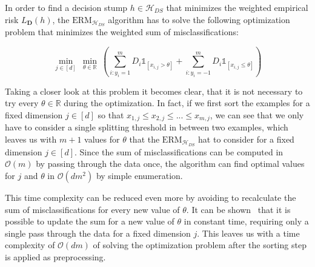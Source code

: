 In order to find a decision stump $h \in \mathcal{H}_{DS}$ that minimizes the weighted empirical risk $L_\mathbf{D}(h)$,
the $\text{ERM}_{\mathcal{H}_{DS}}$ algorithm has to solve
the following optimization problem that minimizes the weighted sum of misclassifications:
\begin{linenomath*}
    $$\min_{j \in \left[ d \right]} \  \min_{\theta \in \mathbb{R}} \ 
        \left( \sum_{i: y_i=1}^m D_i \mathds{1}_{\left[ x_{i, j} > \theta \right]} + 
            \sum_{i: y_i=-1}^m D_i \mathds{1}_{\left[ x_{i, j} \leq \theta \right]} \right)$$
\end{linenomath*}
Taking a closer look at this problem it becomes clear, that it is not necessary to try every $\theta \in \mathbb{R}$
during the optimization.
In fact, if we first sort the examples for a fixed dimension $j \in \left[ d \right]$ so that
$x_{1, j} \leq x_{2, j} \leq ... \leq x_{m, j}$, we can see that we only have to consider a single splitting 
threshold in between two examples, which leaves us with $m+1$ values for $\theta$ that the 
$\text{ERM}_{\mathcal{H}_{DS}}$ hat to consider for a fixed dimension $j \in \left[ d \right]$.
Since the sum of misclassifications can be computed in $\mathcal{O}(m)$ by passing through the data once,
the algorithm can find optimal values for $j$ and $\theta$ in $\mathcal{O}(dm^2)$ by simple enumeration.

This time complexity can be reduced even more by avoiding to recalculate the sum of misclassifications for
every new value of $\theta$. It can be shown~\cite{SSBD14} that it is possible to update the sum for a new
value of $\theta$ in constant time, requiring only a single pass through the data for a fixed dimension $j$.
This leaves us with a time complexity of $\mathcal{O}(dm)$ of solving the optimization problem after the sorting
step is applied as preprocessing.

